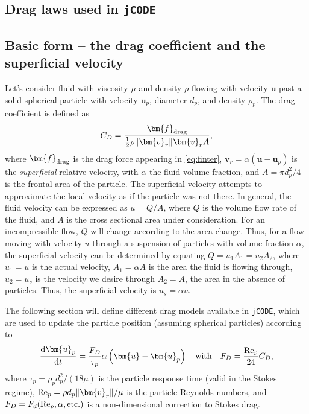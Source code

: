 \documentclass[12pt]{article}
\newcommand{\code}[1]{\texttt{#1}}
\newcommand{\Rep}{\mbox{\rm Re}_p} %
\begin{document}
\newpage
\appendix
\begin{appendices}

\section{Drag laws used in \code{jCODE}}\label{app:drag}
\subsection{Basic form -- the drag coefficient and the superficial velocity}
Let's consider fluid with viscosity $\mu$ and density $\rho$ flowing with velocity $\bm{u}$ past a solid spherical particle with velocity $\bm{u}_p$, diameter $d_p$, and density $\rho_p$. The drag coefficient is defined as
\begin{equation}\label{eq:Cd}
C_D=\frac{\bm{f}_{\rm drag}}{\frac{1}{2}\rho\|\bm{v}_r\|\bm{v}_r A},
\end{equation}
where $\bm{f}_{\rm drag}$ is the drag force appearing in \eqref{eq:finter}, $\bm{v}_r=\alpha(\bm{u}-\bm{u}_p)$ is the \textit{superficial} relative velocity, with $\alpha$ the fluid volume fraction, and $A=\pi d_p^2/4$ is the frontal area of the particle. The superficial velocity attempts to approximate the local velocity as if the particle was not there. In general, the fluid velocity can be expressed as $u=Q/A$, where $Q$ is the volume flow rate of the fluid, and $A$ is the cross sectional area under consideration. For an incompressible flow, $Q$ will change according to the area change. Thus, for a flow moving with velocity $u$ through a suspension of particles with volume fraction $\alpha$, the superficial velocity can be determined by equating $Q=u_1A_1=u_2A_2$, where $u_1=u$ is the actual velocity, $A_1=\alpha A$ is the area the fluid is flowing through, $u_2=u_s$ is the velocity we desire through $A_2=A$, the area in the absence of particles. Thus, the superficial velocity is $u_s=\alpha u$.

The following section will define different drag models available in \code{jCODE}, which are used to update the particle position (assuming spherical particles) according to
\begin{equation}\label{eq:dudt}
\frac{{\rm d}\bm{u}_p}{{\rm d}t}=\frac{F_D}{\tau_p}\alpha\left(\bm{u}-\bm{u}_p\right)\quad\text{with}\quad F_D=\frac{\Rep}{24}C_D,
\end{equation}
where $\tau_p=\rho_p d_p^2/(18\mu)$ is the particle response time (valid in the Stokes regime), $\Rep=\rho d_p\|\bm{v}_r\|/\mu$ is the particle Reynolds numbers, and $F_D=F_d(\Rep,\alpha,\text{etc.})$ is a non-dimensional correction to Stokes drag.


\end{appendices}
\end{document}
